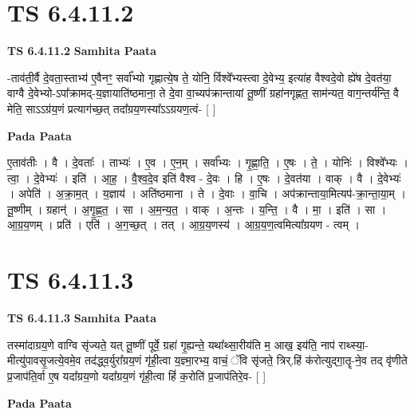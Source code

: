 \documentclass[17pt]{extarticle}
\begin{document}
\section{ TS 6.4.11.2 }

\textbf{TS 6.4.11.2 } \newline
\textbf{Samhita Paata} \newline

-ताव॑ती॒र्वै दे॒वता॒स्ताभ्य॑ ए॒वैनꣳ॒॒ सर्वा᳚भ्यो गृह्णात्ये॒ष ते॒ योनि॒ र्विश्वे᳚भ्यस्त्वा दे॒वेभ्य॒ इत्या॑ह वैश्वदे॒वो ह्ये॑ष दे॒वत॑या॒ वाग्वै दे॒वेभ्यो-ऽपा᳚क्रामद्-य॒ज्ञायाति॑ष्ठमाना॒ ते दे॒वा वा॒च्यप॑क्रान्तायां तू॒ष्णीं ग्रहा॑नगृह्णत॒ साम॑न्यत॒ वाग॒न्तर्य॑न्ति॒ वै मेति॒ साऽऽग्र॑य॒णं प्रत्याग॑च्छ॒त् तदा᳚ग्रय॒णस्या᳚ऽऽग्रयण॒त्वं- [  ] \newline

\textbf{Pada Paata} \newline

ए॒ताव॑तीः । वै । दे॒वताः᳚ । ताभ्यः॑ । ए॒व । ए॒न॒म् । सर्वा᳚भ्यः । गृ॒ह्णा॒ति॒ । ए॒षः । ते॒ । योनिः॑ । विश्वे᳚भ्यः । त्वा॒ । दे॒वेभ्यः॑ । इति॑ । आ॒ह॒ । वै॒श्व॒दे॒व इति॑ वैश्व - दे॒वः । हि । ए॒षः । दे॒वत॑या । वाक् । वै । दे॒वेभ्यः॑ । अपेति॑ । अ॒क्रा॒म॒त् । य॒ज्ञाय॑ । अति॑ष्ठमाना । ते । दे॒वाः । वा॒चि । अप॑क्रान्ताया॒मित्यप॑-क्रा॒न्ता॒या॒म् । तू॒ष्णीम् । ग्रहान्॑ । अ॒गृ॒ह्ण॒त॒ । सा । अ॒म॒न्य॒त॒ । वाक् । अ॒न्तः । य॒न्ति॒ । वै । मा॒ । इति॑ । सा । आ॒ग्र॒य॒णम् । प्रति॑ । एति॑ । अ॒ग॒च्छ॒त् । तत् । आ॒ग्र॒य॒णस्य॑ । आ॒ग्र॒य॒ण॒त्वमित्या᳚ग्रयण - त्वम् ।  \newline





\section{ TS 6.4.11.3 }

\textbf{TS 6.4.11.3 } \newline
\textbf{Samhita Paata} \newline

तस्मा॑दाग्रय॒णे वाग्वि सृ॑ज्यते॒ यत् तू॒ष्णीं पूर्वे॒ ग्रहा॑ गृ॒ह्यन्ते॒ यथा᳚थ्सा॒रीय॑ति म॒ आख॒ इय॑ति॒ नाप॑ राथ्स्या॒-मीत्यु॑पावसृ॒जत्ये॒वमे॒व तद॑द्ध्व॒र्युरा᳚ग्रय॒णं गृ॑ही॒त्वा य॒ज्ञ्मा॒रभ्य॒ वाचं॒ ॅवि सृ॑जते॒ त्रिर्.हिं क॑रोत्युद्गा॒तॄ-ने॒व तद् वृ॑णीते प्र॒जाप॑ति॒र्वा ए॒ष यदा᳚ग्रय॒णो यदा᳚ग्रय॒णं गृ॑ही॒त्वा हिं॑ क॒रोति॑ प्र॒जाप॑तिरे॒व- [  ] \newline

\textbf{Pada Paata} \newline
\end{document}
